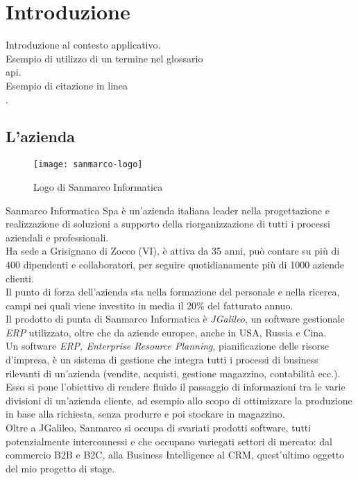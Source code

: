 
\chapter{Introduzione}
\label{cap:introduzione}

Introduzione al contesto applicativo.\\

\noindent Esempio di utilizzo di un termine nel glossario \\
\gls{api}. \\

\noindent Esempio di citazione in linea \\
\cite{site:agile-manifesto}. \\


\section{L'azienda}



\begin{figure}[h]
\centering
\texttt{[image: sanmarco-logo]}
\caption{Logo di Sanmarco Informatica}
\end{figure}
Sanmarco Informatica Spa è un'azienda italiana leader nella progettazione e realizzazione di soluzioni a supporto della riorganizzazione di tutti i processi aziendali e professionali. \\ Ha sede a  Grisignano di Zocco (VI), è attiva da 35 anni, può contare su più di 400 dipendenti e collaboratori, per seguire quotidianamente più di 1000 aziende clienti. \\ 
Il punto di forza dell'azienda sta nella formazione del personale e nella ricerca, campi nei quali viene investito in media il 20\% del fatturato annuo. \\
Il prodotto di punta di  Sanmarco Informatica è \emph{JGalileo}, un software gestionale \emph{ERP} utilizzato, oltre che da aziende europee, anche in USA, Russia e Cina.\\
Un software \emph{ERP, Enterprise Resource Planning}, pianificazione delle risorse d'impresa, è un sistema di gestione che integra tutti i processi di business rilevanti di un'azienda (vendite, acquisti, gestione magazzino, contabilità ecc.).\\Esso si pone l'obiettivo di rendere fluido il passaggio di informazioni tra le varie divisioni di un'azienda cliente, ad esempio allo scopo di ottimizzare la produzione in base alla richiesta, senza produrre e poi stockare in magazzino.\\
Oltre a JGalileo, Sanmarco si occupa di svariati prodotti software, tutti potenzialmente interconnessi e che occupano variegati settori di mercato: dal commercio B2B e B2C, alla Business Intelligence al CRM, quest'ultimo oggetto del mio progetto di stage.\\ 

